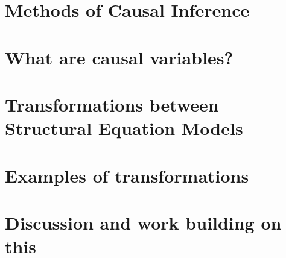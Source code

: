\section{Methods of Causal Inference}
\section{What are causal variables?}
\section{Transformations between Structural Equation Models}
\section{Examples of transformations}
\section{Discussion and work building on this}
